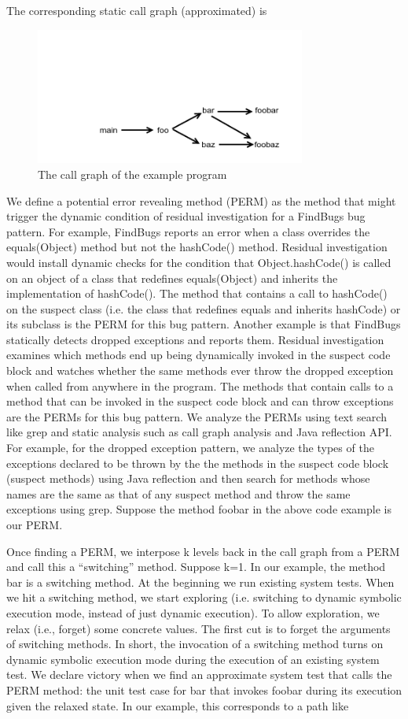 \documentclass[proposal]{umthesis} %
\begin{document}
The corresponding static call graph (approximated) is
\begin{figure}[h]
\centering
\includegraphics[width=3.5in, trim=0.8in 0in 0in 1.0in, clip]{callgraph.png}
\caption{The call graph of the example program}
\end{figure}

We define a potential error revealing method (PERM) as the method that might trigger the dynamic condition of residual investigation for a FindBugs bug pattern.  For example, FindBugs reports an error when a class overrides the equals(Object) method but not the hashCode() method.  Residual investigation would install dynamic checks for the condition that Object.hashCode() is called on an object of a class that redefines equals(Object) and inherits the implementation of hashCode(). The method that contains a call to hashCode() on the suspect class (i.e. the class that redefines equals and inherits hashCode) or its subclass is the PERM for this bug pattern.  Another example is that FindBugs statically detects dropped exceptions and reports them.  Residual investigation examines which methods end up being dynamically invoked in the suspect code block and watches whether the same methods ever throw the dropped exception when called from anywhere in the program. The methods that contain calls to a method that can be invoked in the suspect code block and can throw exceptions are the PERMs for this bug pattern. We analyze the PERMs using text search like grep and static analysis such as call graph analysis and Java reflection API.  For example, for the dropped exception pattern, we analyze the types of the exceptions declared to be thrown by the the methods in the suspect code block (suspect methods) using Java reflection and then search for methods whose names are the same as that of any suspect method and throw the same exceptions using grep.  Suppose the method foobar in the above code example is our PERM.  

Once finding a PERM, we interpose k levels back in the call graph from a PERM and call this a “switching” method.  Suppose k=1. In our example, the method bar is a switching method.  At the beginning we run existing system tests.  When we hit a switching method, we start exploring (i.e. switching to dynamic symbolic execution mode, instead of just dynamic execution).  To allow exploration, we relax (i.e., forget) some concrete values.  The first cut is to forget the arguments of switching methods.  In short, the invocation of a switching method turns on dynamic symbolic execution mode during the execution of an existing system test.  We declare victory when we find an approximate system test that calls the PERM method: the unit test case for bar that invokes foobar during its execution given the relaxed state.  In our example, this corresponds to a path like 
\end{document}
